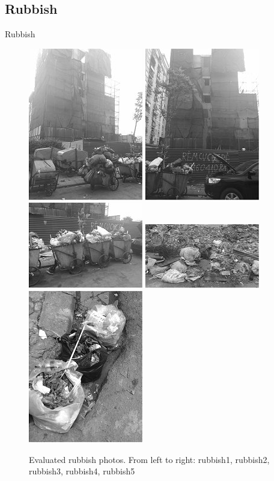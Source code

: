 \documentclass{beamer}
\begin{document}
\subsection{Rubbish}
\begin{frame}{Rubbish}
\begin{figure}[h]
	\centering
	\includegraphics[width=0.18\columnwidth]{images/rubbish1.jpg}
	\includegraphics[width=0.18\columnwidth]{images/rubbish2.jpg}
	\includegraphics[width=0.18\columnwidth]{images/rubbish3.jpg}
	\includegraphics[width=0.18\columnwidth]{images/rubbish4.jpg}
	\includegraphics[width=0.18\columnwidth]{images/rubbish5.jpg}
	\caption{Evaluated rubbish photos. From left to right: rubbish1, rubbish2, rubbish3, rubbish4, rubbish5}
	\label{fig:rubbish}
\end{figure}


\end{frame}
\end{document}
